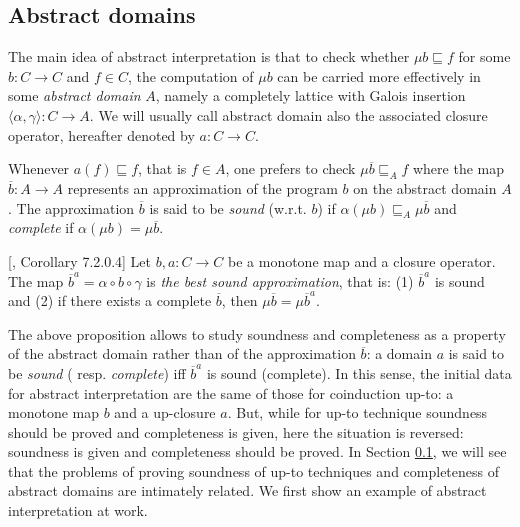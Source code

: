 \documentclass{llncs}
\begin{document}
\subsection{Abstract domains}
The main idea of abstract interpretation is that to check whether  $\mu b\sqsubseteq f$ for some $b\colon C \to C$ and $f\in C$, the computation of $\mu b$ can be carried more effectively in some \emph{abstract domain} $A$, namely a completely lattice with Galois insertion $\langle \alpha, \gamma\rangle \colon C \to A$. We will usually call abstract domain also the associated  closure operator, hereafter denoted by $a\colon C \to C$. 

Whenever $a(f)\sqsubseteq f$, that is $f\in A$, one prefers to check  $\mu \overline{b}\sqsubseteq_A f$ where the map $\overline{b}\colon A\to A$ represents an approximation of the  program $b$ on the abstract domain $A$.
The approximation $\overline{b}$ is said to be \emph{sound} (w.r.t. $b$) if
$\alpha(\mu b) \sqsubseteq_A \mu \overline{b}$ and \emph{complete} if
$\alpha(\mu b) = \mu \overline{b}$.

\begin{proposition}\label{prop:alwayssound}[\cite{cousot1979systematic}, Corollary 7.2.0.4]
Let $b,a\colon C \to C$ be a monotone map and a closure operator. 
The map $\overline{b}^a = \alpha \circ b \circ \gamma $ is \emph{the best sound approximation}, that is: (1) $\overline{b}^a$ is sound and (2) if there exists a complete $\overline{b}$, then $\mu \overline{b} = \mu \overline{b}^a$.
\end{proposition}
The above proposition allows to study soundness and completeness as a property of the abstract domain rather than of the approximation $\overline{b}$: a domain $a$ is said to be \emph{sound} ( resp. \emph{complete}) iff $\overline{b}^a$ is sound (complete). In this sense, the initial data for abstract interpretation are the same of those for coinduction up-to: a monotone map $b$ and a up-closure $a$. But, while for up-to technique soundness should be proved and completeness is given, here the situation is reversed: soundness is given and completeness should be proved. In Section \ref{}, we will see that the problems of proving soundness of up-to techniques and completeness of abstract domains are intimately related. We first show an example of abstract interpretation at work.
\end{document}

